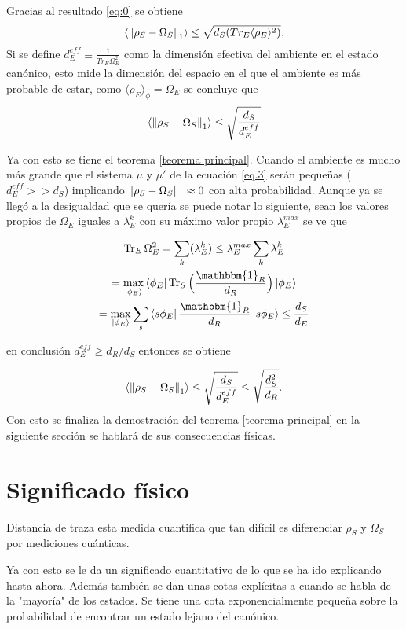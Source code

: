 Gracias al resultado \ref{eq:0} se obtiene
\begin{equation}
\langle \norm{\rho_{S} -\Omega_{S}}_{1} \rangle \le \sqrt{d_{S}(Tr_{E} \langle \rho_{E} \rangle^{2})}.
\end{equation}
Si se define $d_{E}^{eff} \equiv \frac{1}{Tr_{E} \Omega_{E}^{2}}$ como la dimensión efectiva del ambiente en el estado canónico, esto mide la dimensión del espacio en el que el ambiente es más probable de estar, como $\langle \rho_{E} \rangle_{\phi} = \Omega_{E}$ se concluye que 
\begin{equation}
\langle \norm{\rho_{S} -\Omega_{S}}_{1} \rangle \le \sqrt{\frac{d_{S}}{d_{E}^{eff}}}
\end{equation}

Ya con esto se tiene el teorema \ref{teorema principal}. Cuando  el ambiente es mucho más grande que el sistema $\mu$ y $\mu'$  de la ecuación \ref{eq.3} serán pequeñas ($d_{E}^{eff}>>d_{S}$) implicando $\norm{\rho_{S} -\Omega_{S}}_{1} \approx 0$ con alta probabilidad. Aunque ya se llegó a la desigualdad que se quería se puede notar lo siguiente, sean los valores propios de $\Omega_{E}$ iguales a $\lambda_{E}^{k}$ con su máximo valor propio $\lambda_{E}^{max}$ se ve que 

\begin{multline}
\Tr_{E} \Omega_{E}^{2} = \sum_{k} (\lambda_{E}^{k})
\leq \lambda_{E}^{max} \sum_{k} \lambda_{E}^{k}\\
= \max_{\ket{\phi_{E}}} \bra{\phi_{E}} \Tr_{S} \Big( \frac{\mathbbm{1}_{R}}{d_{R}} \Big) \ket{\phi_{E}}\\
= \max_{\ket{\phi_{E}}} \sum_{s} \bra{s \phi_{E}} \frac{\mathbbm{1}_{R}}{d_{R}} \ket{s \phi_{E}} \leq \frac{d_{S}}{d_{E}}	
\end{multline}

en conclusión  $d^{eff}_{E} \geq d_{R}/ d_{S}$ entonces se obtiene

\begin{equation}
\langle \norm{\rho_{S} - \Omega_{S}}_{1} \rangle \leq \sqrt{\frac{d_{S}}{d_{E}^{eff}}} \leq  \sqrt{\frac{d_{S}^{2}}{d_{R}}}.
\end{equation}
Con esto se finaliza la demostración del teorema \ref{teorema principal} en la siguiente sección se hablará de sus consecuencias físicas.

\section{Significado físico}

Distancia de traza esta medida cuantifica que tan difícil es diferenciar $\rho_{S}$ y $\Omega_{S}$ por mediciones cuánticas.

Ya con esto se le da un significado cuantitativo de lo que se ha ido explicando hasta ahora. Además también se dan unas cotas explícitas a cuando se habla de la "mayoría" de los estados. Se tiene una cota exponencialmente pequeña  sobre la probabilidad de encontrar un estado lejano del canónico.\\ %






